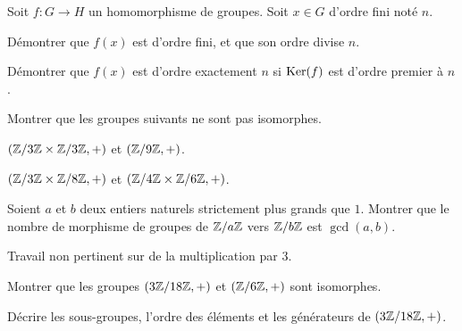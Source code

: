 \documentclass{report}
\begin{document}
\begin{exo}
    Soit \(f\colon G\to H\) un homomorphisme de groupes. Soit \(x\in G\) d'ordre
    fini noté \(n\).
    \begin{q}{1}
        Démontrer que \(f(x)\) est d'ordre fini, et que son ordre divise \(n\).
    \end{q}
    \begin{q}{2}
        Démontrer que \(f(x)\) est d'ordre exactement \(n\) si \(\operatorname{Ker}(f)\) est
        d'ordre premier à \(n\).
    \end{q}
\end{exo}

\begin{exo}
    Montrer que les groupes suivants ne sont pas isomorphes.
    \begin{q}{1}
        \(\left(\mathbb{Z}/3\mathbb{Z}\times\mathbb{Z}/3\mathbb{Z},+\right)\) et \(\left(\mathbb{Z}/9\mathbb{Z},+\right)\).
    \end{q}
    \begin{q}{2}
        \(\left(\mathbb{Z}/3\mathbb{Z}\times\mathbb{Z}/8\mathbb{Z},+\right)\) et \(\left(\mathbb{Z}/4\mathbb{Z}\times\mathbb{Z}/6\mathbb{Z},+\right)\).
    \end{q}
\end{exo}

\begin{exo}
    Soient \(a\) et \(b\) deux entiers naturels strictement plus grands que \(1\).
    Montrer que le nombre de morphisme de groupes de \(\mathbb{Z}/a\mathbb{Z}\) vers \(\mathbb{Z}/b\mathbb{Z}\)
    est \(\gcd(a,b)\).
\end{exo}

\begin{exo}
    Travail non pertinent sur de la multiplication par 3.
    \begin{q}{1}
        Montrer que les groupes \(\left(3\mathbb{Z}/18\mathbb{Z},+\right)\) et \(\left(\mathbb{Z}/6\mathbb{Z},+\right)\)
        sont isomorphes.
    \end{q}
    \begin{q}{2}
        Décrire les sous-groupes, l'ordre des éléments et les générateurs de
        \(\left(3\mathbb{Z}/18\mathbb{Z},+\right)\).
    \end{q}
\end{exo}
\end{document}
